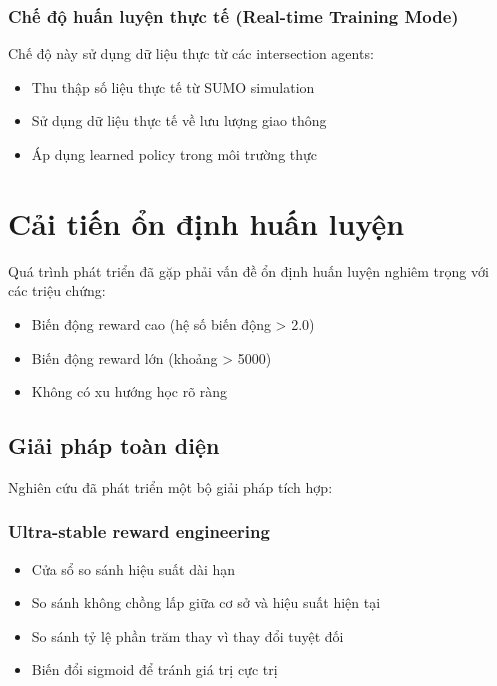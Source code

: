 \subsubsection{Chế độ huấn luyện thực tế (Real-time Training Mode)}
Chế độ này sử dụng dữ liệu thực từ các intersection agents:
\begin{itemize}
    \item Thu thập số liệu thực tế từ SUMO simulation

    \item Sử dụng dữ liệu thực tế về lưu lượng giao thông

    \item Áp dụng learned policy trong môi trường thực
\end{itemize}

\section{Cải tiến ổn định huấn luyện}

Quá trình phát triển đã gặp phải vấn đề ổn định huấn luyện nghiêm trọng với các
triệu chứng:
\begin{itemize}
    \item Biến động reward cao (hệ số biến động > 2.0)

    \item Biến động reward lớn (khoảng > 5000)

    \item Không có xu hướng học rõ ràng
\end{itemize}

\subsection{Giải pháp toàn diện}
Nghiên cứu đã phát triển một bộ giải pháp tích hợp:

\subsubsection{Ultra-stable reward engineering}
\begin{itemize}
    \item Cửa sổ so sánh hiệu suất dài hạn

    \item So sánh không chồng lấp giữa cơ sở và hiệu suất hiện tại

    \item So sánh tỷ lệ phần trăm thay vì thay đổi tuyệt đối

    \item Biến đổi sigmoid để tránh giá trị cực trị
\end{itemize}

